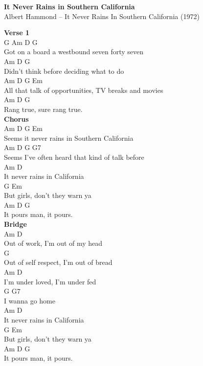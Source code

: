 \documentclass[a4paper]{article}
\begin{document}
    \begin{center}
        \textbf{It Never Rains in Southern California}
        ~\\
        Albert Hammond -- It Never Rains In Southern California (1972)
    \end{center}
    {
        \scriptsize
        \textbf{Verse 1}
        ~\\
        {
            \cutive
            \obeyspaces
G        Am                D           G
\\
Got on a board a westbound seven forty seven
\\
       Am             D              G
\\
Didn't think before deciding what to do
\\
         Am           D         G             Em
\\
All that talk of opportunities, TV breaks and movies
\\
     Am  D           G
\\
Rang true, sure rang true.
\\

        }
        \textbf{Chorus}
        ~\\
        {
            \cutive
            \obeyspaces
         Am             D            G    Em
\\
Seems it never rains in Southern California
\\
           Am               D              G   G7
\\
Seems I've often heard that kind of talk before
\\
         Am           D
\\
It never rains in California
\\
    G                 Em
\\
But girls, don't they warn ya
\\
   Am   D        G
\\
It pours man, it pours.
\\

        }
        \textbf{Bridge}
        ~\\
        {
            \cutive
            \obeyspaces
       Am                  D
\\
Out of work, I'm out of my head
\\
               G
\\
Out of self respect, I'm out of bread
\\
          Am               D
\\
I'm under loved, I'm under fed
\\
           G    G7
\\
I wanna go home
\\
         Am           D
\\
It never rains in California
\\
    G                 Em
\\
But girls, don't they warn ya
\\
   Am   D        G
\\
It pours man, it pours.
\\

}}
\end{document}
